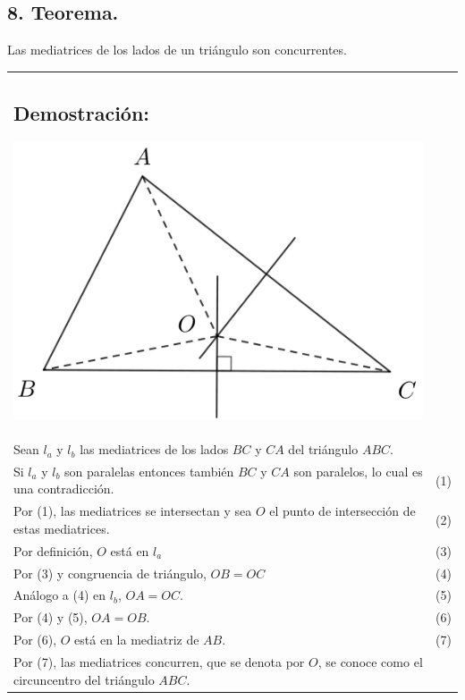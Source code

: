 \documentclass[12pt,a4paper]{article}
\begin{document}
\subsection*{8. Teorema.}
Las mediatrices de los lados de un triángulo son concurrentes.\\
\begin{tabular}{p{15.9cm}p{1cm}}
\subsection*{Demostración:}
\begin{center}
\includegraphics[scale=0.6]{mediatriz.png} 
\end{center}
\\Sean $l_a$ y $l_b$ las mediatrices de los lados $BC$ y $CA$ del triángulo $ABC.$
\\Si $l_a$ y $l_b$ son paralelas entonces también $BC$ y $CA$ son paralelos, lo cual es una contradicción. &\medskip(1)
\\Por (1), las mediatrices se intersectan y sea $O$ el punto de intersección de estas mediatrices. & (2) 
\\Por definición, $O$ está en $l_a$ &(3)
\\Por (3) y congruencia de triángulo, $OB=OC$ &(4)
\\ Análogo a (4) en $l_b$, $OA=OC$. &(5)
\\Por (4) y (5), $OA=OB$. &(6)
\\Por (6), $O$ está en la mediatriz de $AB$. &(7)
\\ Por (7), las mediatrices concurren, que se denota por $O$, se conoce como el circuncentro del triángulo $ABC$. 
\end{tabular}
\end{document}
